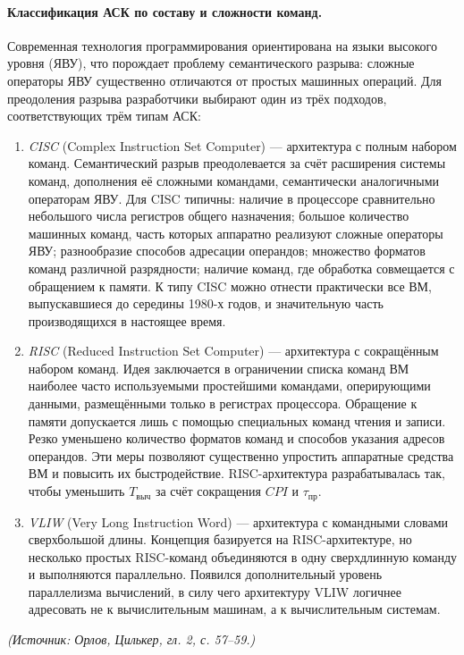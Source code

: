 \documentclass[a4paper,12pt]{article}
\begin{document}
\paragraph{Классификация АСК по составу и сложности команд.}
Современная технология программирования ориентирована на языки высокого уровня (ЯВУ), что порождает проблему семантического разрыва: сложные операторы ЯВУ существенно отличаются от простых машинных операций. Для преодоления разрыва разработчики выбирают один из трёх подходов, соответствующих трём типам АСК:
\begin{enumerate}[label=\arabic*)]
\item \emph{CISC} (Complex Instruction Set Computer) --- архитектура с полным набором команд. Семантический разрыв преодолевается за счёт расширения системы команд, дополнения её сложными командами, семантически аналогичными операторам ЯВУ. Для CISC типичны: наличие в процессоре сравнительно небольшого числа регистров общего назначения; большое количество машинных команд, часть которых аппаратно реализуют сложные операторы ЯВУ; разнообразие способов адресации операндов; множество форматов команд различной разрядности; наличие команд, где обработка совмещается с обращением к памяти. К типу CISC можно отнести практически все ВМ, выпускавшиеся до середины 1980-х годов, и значительную часть производящихся в настоящее время.
\item \emph{RISC} (Reduced Instruction Set Computer) --- архитектура с сокращённым набором команд. Идея заключается в ограничении списка команд ВМ наиболее часто используемыми простейшими командами, оперирующими данными, размещёнными только в регистрах процессора. Обращение к памяти допускается лишь с помощью специальных команд чтения и записи. Резко уменьшено количество форматов команд и способов указания адресов операндов. Эти меры позволяют существенно упростить аппаратные средства ВМ и повысить их быстродействие. RISC-архитектура разрабатывалась так, чтобы уменьшить \(T_{\text{выч}}\) за счёт сокращения \(CPI\) и \(\tau_{\text{пр}}\).
\item \emph{VLIW} (Very Long Instruction Word) --- архитектура с командными словами сверхбольшой длины. Концепция базируется на RISC-архитектуре, но несколько простых RISC-команд объединяются в одну сверхдлинную команду и выполняются параллельно. Появился дополнительный уровень параллелизма вычислений, в силу чего архитектуру VLIW логичнее адресовать не к вычислительным машинам, а к вычислительным системам.
\end{enumerate}
\textit{(Источник: Орлов, Цилькер, гл. 2, с. 57--59.)}
\end{document}

